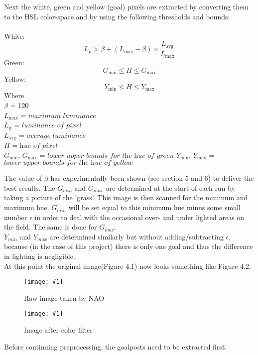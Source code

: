 \documentclass{ba-kecs}
\numberwithin{figure}{section}
\numberwithin{equation}{section}
\newcommand{\dkepic}[2]{ %
	\begin{figure}[H] %
	\texttt{[image: \#1]}
	\caption{#2}
	\label{#1}
	\end{figure}
}
\begin{document}
Next the white, green and yellow (goal) pixels are extracted by converting them to the HSL color-space and by using the following thresholds and bounds:\\ \\
White:
	\begin{equation}
	L_{p} > \beta + (L_{\mathrm{max}}-\beta) \times \frac{L_{\mathrm{avg}}}{L_{\mathrm{max}}} \label{whiteImgProc}
	\end{equation}
Green:
	\begin{equation}
	G_{\mathrm{min}} \leq H \leq G_{\mathrm{max}} \label{greenImgProc}
	\end{equation}
Yellow:
	\begin{equation}
	Y_{\mathrm{min}} \leq H \leq Y_{\mathrm{max}} \label{yellowImgProc}
	\end{equation}
Where \\
	$\beta$ = 120 \\
	$L_{\mathrm{max}}$ = $\textit{maximum luminance}$ \\
	$L_{\mathrm{p}}$ = $\textit{luminance of pixel}$ \\
	$L_{\mathrm{avg}}$ = $\textit{average luminance}$ \\
	$\textit{H}$ = $\textit{hue of pixel}$ \\
	$G_{\mathrm{min}}$, $G_{\mathrm{max}}$ = $\textit{lower upper bounds for 		the hue of green}$
	$Y_{\mathrm{min}}$, $Y_{\mathrm{max}}$ = $\textit{lower upper bounds for 		the hue of yellow}$
	
The value of $\beta$ has experimentally been shown (see section 5 and 6) to deliver the best results. The $G_{min}$ and $G_{max}$ are determined at the start of each run by taking a picture of the 'grass'. This image is then scanned for the minimum and maximum hue. $G_{min}$ will be set equal to this minimum hue minus some small number $\epsilon$ in order to deal with the occasional over- and under lighted areas on the field. The same is done for $G_{max}$.\\
$Y_{min}$ and $Y_{max}$ are determined similarly but without adding/subtracting $\epsilon$, because (in the case of this project) there is only one goal and thus the difference in lighting is negligible.\\
At this point the original image(Figure 4.1) now looks something like Figure 4.2.\\
\dkepic{figure_IP1}{Raw image taken by NAO}
\dkepic{figure_IP2}{Image after color filter}
Before continuing preprocessing, the goalposts need to be extracted first.
\end{document}
